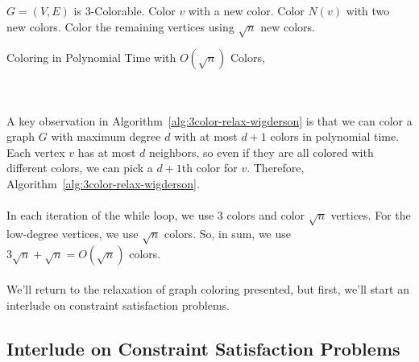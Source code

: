         \begin{algorithm}[H] 
            \begin{algorithmic}[1]
                \Require \(G=(V,E)\) is \(3\)-Colorable.
                        \State Color \(v\) with a new color. 
                        \State Color \(N(v)\) with two new colors.
                    \EndWhile
                    \State Color the remaining vertices using \(\sqrt{n}\) new colors.
                \EndProcedure 
            \end{algorithmic}
            \caption{Coloring in Polynomial Time with \(O(\sqrt{n})\) Colors, \cite{wigderson1983improving}}
            \label{alg:3color-relax-wigderson}
        \end{algorithm}
        \vphantom
        \\
        \\
        A key observation in Algorithm~\ref{alg:3color-relax-wigderson} is that we can color a graph \(G\) with maximum degree \(d\) with at most \(d+1\) colors in polynomial time. Each vertex \(v\) has at most \(d\) neighbors, so even if they are all colored with different colors, we can pick a \(d+1\)th color for \(v\). Therefore, Algorithm~\ref{alg:3color-relax-wigderson}.
        \\
        \\
        In each iteration of the while loop, we use \(3\) colors and color \(\sqrt{n}\) vertices. For the low-degree vertices, we use \(\sqrt{n}\) colors. So, in sum, we use \(3\sqrt{n}+\sqrt{n}=O(\sqrt{n})\) colors.
        \\
        \\
        We'll return to the relaxation of graph coloring presented, but first, we'll start an interlude on constraint satisfaction problems.

\pagebreak

    \subsection{Interlude on Constraint Satisfaction Problems}

